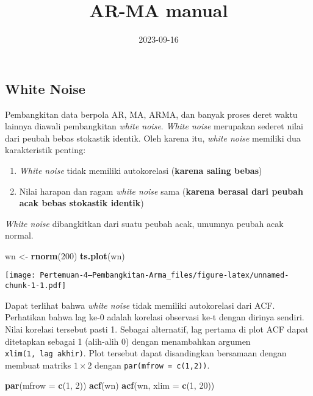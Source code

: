 \documentclass[
]{article}
\title{AR-MA manual}
\author{}
\date{\vspace{-2.5em}2023-09-16}
\newenvironment{Shaded}{\begin{snugshade}}{\end{snugshade}}
\newcommand{\AttributeTok}[1]{\textcolor[rgb]{0.13,0.29,0.53}{#1}}
\newcommand{\DecValTok}[1]{\textcolor[rgb]{0.00,0.00,0.81}{#1}}
\newcommand{\FunctionTok}[1]{\textcolor[rgb]{0.13,0.29,0.53}{\textbf{#1}}}
\newcommand{\NormalTok}[1]{#1}
\newcommand{\OtherTok}[1]{\textcolor[rgb]{0.56,0.35,0.01}{#1}}
\providecommand{\tightlist}{%
  \setlength{\itemsep}{0pt}\setlength{\parskip}{0pt}}
\begin{document}
\maketitle

\subsection{White Noise}\label{white-noise}

Pembangkitan data berpola AR, MA, ARMA, dan banyak proses deret waktu
lainnya diawali pembangkitan \emph{white noise}. \emph{White noise}
merupakan sederet nilai dari peubah bebas stokastik identik. Oleh karena
itu, \emph{white noise} memiliki dua karakteristik penting:

\begin{enumerate}
\def\labelenumi{\arabic{enumi}.}
\tightlist
\item
  \emph{White noise} tidak memiliki autokorelasi (\textbf{karena saling
  bebas})
\item
  Nilai harapan dan ragam \emph{white noise} sama (\textbf{karena
  berasal dari peubah acak bebas stokastik identik})
\end{enumerate}

\emph{White noise} dibangkitkan dari suatu peubah acak, umumnya peubah
acak normal.

\begin{Shaded}
\begin{Highlighting}[]
\NormalTok{wn }\OtherTok{\textless{}{-}} \FunctionTok{rnorm}\NormalTok{(}\DecValTok{200}\NormalTok{)}
\FunctionTok{ts.plot}\NormalTok{(wn)}
\end{Highlighting}
\end{Shaded}

\texttt{[image: Pertemuan-4---Pembangkitan-Arma\_files/figure-latex/unnamed-chunk-1-1.pdf]}

Dapat terlihat bahwa \emph{white noise} tidak memiliki autokorelasi dari
ACF. Perhatikan bahwa lag ke-0 adalah korelasi observasi ke-t dengan
dirinya sendiri. Nilai korelasi tersebut pasti 1. Sebagai alternatif,
lag pertama di plot ACF dapat ditetapkan sebagai 1 (alih-alih 0) dengan
menambahkan argumen \texttt{xlim(1,\ lag\ akhir)}. Plot tersebut dapat
disandingkan bersamaan dengan membuat matriks \(1 \times 2\) dengan
\texttt{par(mfrow\ =\ c(1,2))}.

\begin{Shaded}
\begin{Highlighting}[]
\FunctionTok{par}\NormalTok{(}\AttributeTok{mfrow =} \FunctionTok{c}\NormalTok{(}\DecValTok{1}\NormalTok{, }\DecValTok{2}\NormalTok{)) }
\FunctionTok{acf}\NormalTok{(wn)}
\FunctionTok{acf}\NormalTok{(wn, }\AttributeTok{xlim =} \FunctionTok{c}\NormalTok{(}\DecValTok{1}\NormalTok{, }\DecValTok{20}\NormalTok{))}
\end{Highlighting}
\end{Shaded}
\end{document}
